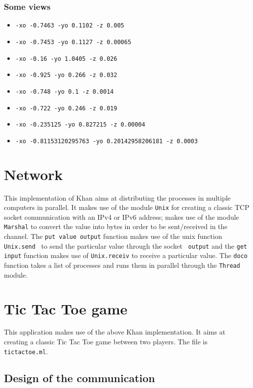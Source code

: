 \documentclass{article}
\begin{document}
\subsubsection{Some views}
\begin{itemize}[label={}]
	\item \texttt{-xo -0.7463 -yo 0.1102 -z 0.005}
	\item \texttt{-xo -0.7453 -yo 0.1127 -z 0.00065}
	\item \texttt{-xo -0.16 -yo 1.0405 -z 0.026}
	\item \texttt{-xo -0.925 -yo 0.266 -z 0.032}
	\item \texttt{-xo -0.748 -yo 0.1 -z 0.0014}
	\item \texttt{-xo -0.722 -yo 0.246 -z 0.019}
	\item \texttt{-xo -0.235125 -yo 0.827215 -z 0.00004}
	\item \texttt{-xo -0.81153120295763 -yo 0.20142958206181 -z 0.0003}
\end{itemize}\section{Network}
This implementation of Khan aims at distributing the processes in multiple computers in parallel. It makes use of the module \texttt{Unix} for creating a classic TCP socket communication with an IPv4 or IPv6 address; makes use of the module \texttt{Marshal} to convert the value into bytes in order to be sent/received in the channel. The \texttt{put value output} function makes use of the unix function \texttt{Unix.send } to send the particular value through the socket \texttt{ output} and the \texttt{get input} function makes use of \texttt{Unix.receiv} to receive a particular value. The \texttt{doco} function takes a list of processes and runs them in parallel through the \texttt{Thread} module.

\section{Tic Tac Toe game}

This application makes use of the above Khan implementation. It aims at creating a classic Tic Tac Toe game between two players. The file is \texttt{tictactoe.ml}.

\subsection{Design of the communication }
\end{document}
